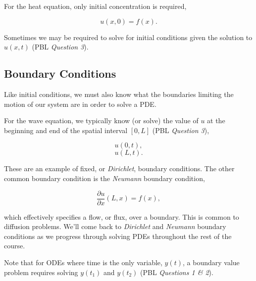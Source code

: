 \documentclass[12pt]{article}
\begin{document}
For the heat equation, only initial concentration is required,

\vspace{2mm}

$$ u(x,0) = f(x). $$

\vspace{4mm}

Sometimes we may be required to solve for initial conditions given the solution to $u(x,t)$ (PBL \textit{Question 3}).

\subsection{Boundary Conditions}

Like initial conditions, we must also know what the boundaries limiting the motion of our system are in order to solve a PDE.

\vspace{4mm}

For the wave equation, we typically know (or solve) the value of $u$ at the beginning and end of the spatial interval $[0,L]$ (PBL \textit{Question 3}),

\vspace{2mm}

$$ u(0,t), $$
$$ u(L,t). $$

\vspace{4mm}

These are an example of fixed, or \textit{Dirichlet}, boundary conditions. The other common boundary condition is the \textit{Neumann} boundary condition, 

\vspace{2mm}

$$ \frac{\partial u}{\partial x}(L,x) = f(x), $$

\vspace{4mm}

which effectively specifies a flow, or flux, over a boundary. This is common to diffusion problems. We'll come back to \textit{Dirichlet} and \textit{Neumann} boundary conditions as we progress through solving PDEs throughout the rest of the course.

\vspace{4mm}

Note that for ODEs where time is the only variable, $y(t)$, a boundary value problem requires solving $y(t_1)$ and $y(t_2)$ (PBL \textit{Questions 1 \& 2}).
\end{document}
